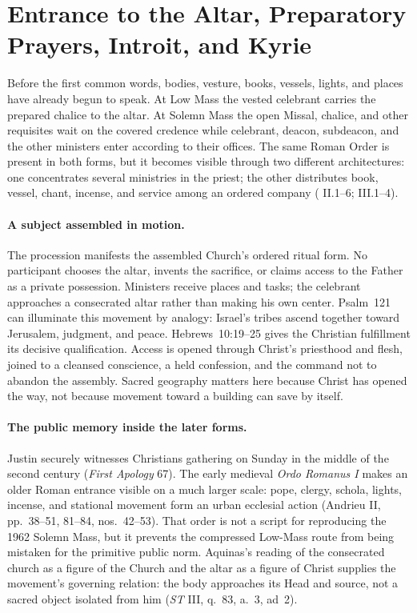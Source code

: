 \section{Entrance to the Altar, Preparatory Prayers, Introit, and Kyrie}


Before the first common words, bodies, vesture, books, vessels, lights, and places have already begun to speak. At Low Mass the vested celebrant carries the prepared chalice to the altar. At Solemn Mass the open Missal, chalice, and other requisites wait on the covered credence while celebrant, deacon, subdeacon, and the other ministers enter according to their offices. The same Roman Order is present in both forms, but it becomes visible through two different architectures: one concentrates several ministries in the priest; the other distributes book, vessel, chant, incense, and service among an ordered company ( II.1--6; III.1--4).

\paragraph{A subject assembled in motion.}
The procession manifests the assembled Church's ordered ritual form. No participant chooses the altar, invents the sacrifice, or claims access to the Father as a private possession. Ministers receive places and tasks; the celebrant approaches a consecrated altar rather than making his own center. Psalm~121 can illuminate this movement by analogy: Israel's tribes ascend together toward Jerusalem, judgment, and peace. Hebrews~10:19--25 gives the Christian fulfillment its decisive qualification. Access is opened through Christ's priesthood and flesh, joined to a cleansed conscience, a held confession, and the command not to abandon the assembly. Sacred geography matters here because Christ has opened the way, not because movement toward a building can save by itself.

\paragraph{The public memory inside the later forms.}
Justin securely witnesses Christians gathering on Sunday in the middle of the second century (\emph{First Apology} 67). The early medieval \emph{Ordo Romanus I} makes an older Roman entrance visible on a much larger scale: pope, clergy, schola, lights, incense, and stational movement form an urban ecclesial action (Andrieu II, pp.~38--51, 81--84, nos.~42--53). That order is not a script for reproducing the 1962 Solemn Mass, but it prevents the compressed Low-Mass route from being mistaken for the primitive public norm. Aquinas's reading of the consecrated church as a figure of the Church and the altar as a figure of Christ supplies the movement's governing relation: the body approaches its Head and source, not a sacred object isolated from him (\emph{ST} III, q.~83, a.~3, ad~2).

